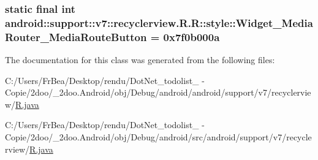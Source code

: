 \hypertarget{classandroid_1_1support_1_1v7_1_1recyclerview_1_1_r_1_1style_3e6070863c794118f6f2dcc4d4b36898}{
\subsubsection[{Widget\_\-MediaRouter\_\-MediaRouteButton}]{\setlength{\rightskip}{0pt plus 5cm}static final int android::support::v7::recyclerview.R.R::style::Widget\_\-MediaRouter\_\-MediaRouteButton = 0x7f0b000a}}
\label{classandroid_1_1support_1_1v7_1_1recyclerview_1_1_r_1_1style_3e6070863c794118f6f2dcc4d4b36898}




The documentation for this class was generated from the following files:\begin{CompactItemize}
\item 
C:/Users/FrBea/Desktop/rendu/DotNet\_\-todolist\_ - Copie/2doo/\_\-2doo.Android/obj/Debug/android/android/support/v7/recyclerview/\hyperlink{android_2support_2v7_2recyclerview_2_r_8java}{R.java}\item 
C:/Users/FrBea/Desktop/rendu/DotNet\_\-todolist\_ - Copie/2doo/\_\-2doo.Android/obj/Debug/android/src/android/support/v7/recyclerview/\hyperlink{src_2android_2support_2v7_2recyclerview_2_r_8java}{R.java}\end{CompactItemize}
